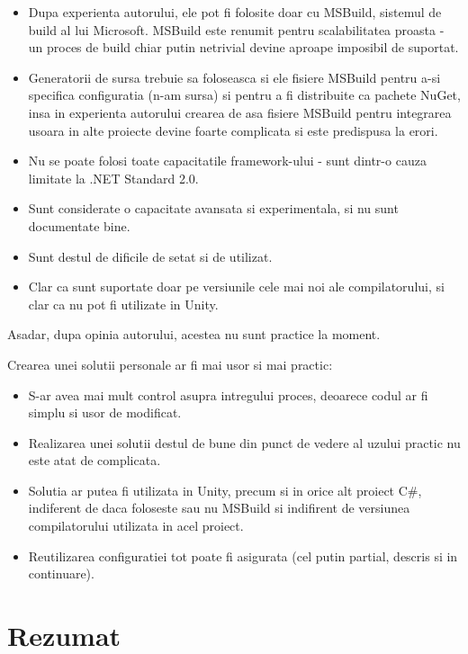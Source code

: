 \documentclass{report}
\begin{document}
\begin{itemize}
\item
  Dupa experienta autorului, ele pot fi folosite doar cu MSBuild,
  sistemul de build al lui Microsoft. MSBuild este renumit pentru
  scalabilitatea proasta - un proces de build chiar putin netrivial
  devine aproape imposibil de suportat.
\item
  Generatorii de sursa trebuie sa foloseasca si ele fisiere MSBuild
  pentru a-si specifica configuratia (n-am sursa) si pentru a fi
  distribuite ca pachete NuGet, insa in experienta autorului crearea de
  asa fisiere MSBuild pentru integrarea usoara in alte proiecte devine
  foarte complicata si este predispusa la erori.
\item
  Nu se poate folosi toate capacitatile framework-ului - sunt dintr-o
  cauza limitate la .NET Standard 2.0.
\item
  Sunt considerate o capacitate avansata si experimentala, si nu sunt
  documentate bine.
\item
  Sunt destul de dificile de setat si de utilizat.
\item
  Clar ca sunt suportate doar pe versiunile cele mai noi ale
  compilatorului, si clar ca nu pot fi utilizate in Unity.
\end{itemize}

Asadar, dupa opinia autorului, acestea nu sunt practice la moment.

Crearea unei solutii personale ar fi mai usor si mai practic:

\begin{itemize}
\item
  S-ar avea mai mult control asupra intregului proces, deoarece codul ar
  fi simplu si usor de modificat.
\item
  Realizarea unei solutii destul de bune din punct de vedere al uzului
  practic nu este atat de complicata.
\item
  Solutia ar putea fi utilizata in Unity, precum si in orice alt proiect
  C\#, indiferent de daca foloseste sau nu MSBuild si indifirent de
  versiunea compilatorului utilizata in acel proiect.
\item
  Reutilizarea configuratiei tot poate fi asigurata (cel putin partial,
  descris si in continuare).
\end{itemize}

\section{Rezumat}
\end{document}
